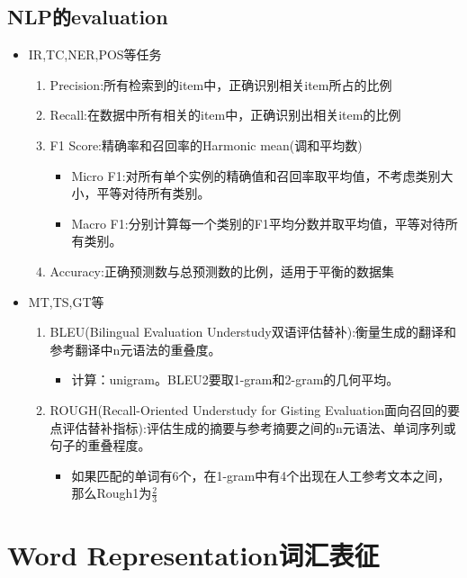 \documentclass[UTF8]{ctexart}
\begin{document}
\subsection{NLP的evaluation}
\begin{itemize}
    \item IR,TC,NER,POS等任务
    \begin{enumerate}
        \item Precision:所有检索到的item中，正确识别相关item所占的比例
        \item Recall:在数据中所有相关的item中，正确识别出相关item的比例
        \item F1 Score:精确率和召回率的Harmonic mean(调和平均数)
        \begin{itemize}
            \item Micro F1:对所有单个实例的精确值和召回率取平均值，不考虑类别大小，平等对待所有类别。
            \item Macro F1:分别计算每一个类别的F1平均分数并取平均值，平等对待所有类别。
        \end{itemize}
        \item Accuracy:正确预测数与总预测数的比例，适用于平衡的数据集
    \end{enumerate}

    \item MT,TS,GT等
    \begin{enumerate}
        \item BLEU(Bilingual Evaluation Understudy双语评估替补):衡量生成的翻译和参考翻译中n元语法的重叠度。
        \begin{itemize}
            \item 计算：unigram。BLEU2要取1-gram和2-gram的几何平均。
        \end{itemize}
        \item ROUGH(Recall-Oriented Understudy for Gisting Evaluation面向召回的要点评估替补指标):评估生成的摘要与参考摘要之间的n元语法、单词序列或句子的重叠程度。
        \begin{itemize}
            \item 如果匹配的单词有6个，在1-gram中有4个出现在人工参考文本之间，那么Rough1为$\frac{2}{3}$
        \end{itemize}
    \end{enumerate}
\end{itemize}

\section{Word Representation词汇表征}
\end{document}

